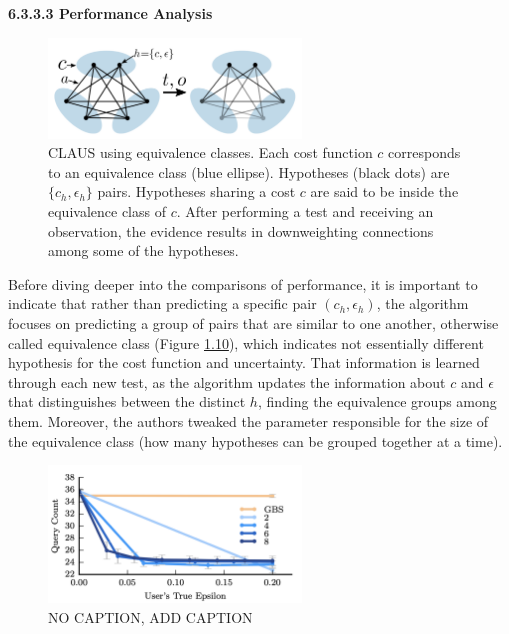 \documentclass[
  letterpaper,
  DIV=11,
  numbers=noendperiod,
  oneside]{scrreprt}
\theoremstyle{remark}
\begin{document}
\textbf{6.3.3.3 Performance Analysis}

\begin{figure}

{\centering \includegraphics[width=0.6\textwidth,height=\textheight]{Figures/equiv.png}

}

\caption{CLAUS using equivalence classes. Each cost function \(c\)
corresponds to an equivalence class (blue ellipse). Hypotheses (black
dots) are \(\{c_h,\epsilon_h\}\) pairs. Hypotheses sharing a cost \(c\)
are said to be inside the equivalence class of \(c\). After performing a
test and receiving an observation, the evidence results in downweighting
connections among some of the hypotheses.}

\end{figure}%

Before diving deeper into the comparisons of performance, it is
important to indicate that rather than predicting a specific pair
\((c_h, \epsilon_h)\), the algorithm focuses on predicting a group of
pairs that are similar to one another, otherwise called equivalence
class (Figure \hyperref[fig:equiv_c]{1.10}), which indicates not
essentially different hypothesis for the cost function and uncertainty.
That information is learned through each new test, as the algorithm
updates the information about \(c\) and \(\epsilon\) that distinguishes
between the distinct \(h\), finding the equivalence groups among them.
Moreover, the authors tweaked the parameter responsible for the size of
the equivalence class (how many hypotheses can be grouped together at a
time).

\begin{figure}

{\centering \includegraphics[width=0.6\textwidth,height=\textheight]{Figures/GBS:CLAUS.png}

}

\caption{NO CAPTION, ADD CAPTION}

\end{figure}%
\end{document}
